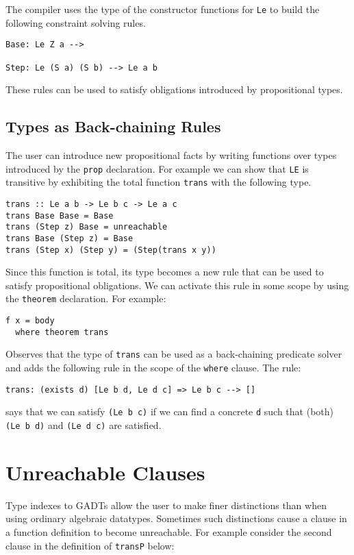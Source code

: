 \documentclass[11pt,twoside]{article}
\begin{document}
The compiler uses the type of the constructor functions
for {\tt Le} to build the following constraint solving rules.

\begin{verbatim}
Base: Le Z a -->

Step: Le (S a) (S b) --> Le a b
\end{verbatim}
These rules can be used to satisfy obligations introduced
by propositional types. 


\subsection{Types as Back-chaining Rules}\label{back}

The user can introduce
new propositional facts by writing functions over types
introduced by the {\tt prop} declaration. For example
we can show that {\tt LE} is transitive by exhibiting
the total function {\tt trans} with the following type.

\begin{verbatim}
trans :: Le a b -> Le b c -> Le a c
trans Base Base = Base
trans (Step z) Base = unreachable
trans Base (Step z) = Base
trans (Step x) (Step y) = (Step(trans x y))  
\end{verbatim}

Since this function is total, its type becomes a new rule
that can be used to satisfy propositional obligations. We
can activate this rule in some scope by using the {\tt theorem} declaration.
For example:
\begin{verbatim}
f x = body
  where theorem trans
\end{verbatim}
Observes that the type of {\tt trans} can be used
as a back-chaining predicate solver and adds the following rule
in the scope of the {\tt where} clause. The rule:

\begin{verbatim}
trans: (exists d) [Le b d, Le d c] => Le b c --> []
\end{verbatim}   
says that we can satisfy {\tt (Le b c)} if we can find
a concrete {\tt d} such that (both) {\tt (Le b d)} and {\tt (Le d c)}
are satisfied.


\section{Unreachable Clauses}

Type indexes to GADTs allow the user to make finer distinctions
than when using ordinary algebraic datatypes. Sometimes such
distinctions cause a clause in a function definition to become
unreachable. For example consider the second clause in the definition of 
{\tt transP} below:
\end{document}
